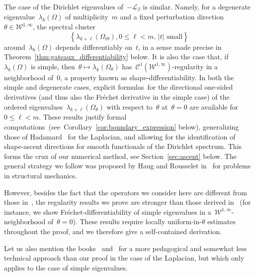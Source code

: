 \documentclass[a4]{article}
\newcommand{\cL}{\mathcal{L}}
\newcommand{\1}{\mathbbm 1}
\newcommand{\Winf}{{{\cW}^{1,\infty}}}
\newcommand{\cW}{\mathcal{W}}
\begin{document}
        The case of the Dirichlet eigenvalues of~$-\cL_\beta$ is similar.
        Namely, for a degenerate eigenvalue~$\lambda_k(\Omega)$ of multiplicity~$m$ and a fixed perturbation direction~$\theta\in\Winf$, the spectral cluster
        $$\left\{\lambda_{k+\ell}(\Omega_{t\theta}),0\leq \ell < m,\,|t|\text{ small}\right\}$$
         around~$\lambda_k(\Omega)$ depends differentiably on~$t$, in a sense made precise in Theorem~\ref{thm:gateaux_differentiability} below.
        It is also the case that, if~$\lambda_k(\Omega)$ is simple, then~$\theta\mapsto \lambda_k(\Omega_\theta)$ has~$\mathcal C^1(\Winf)$-regularity in a neighborhood of~$0$, a property known as shape-differentiability.
        In both the simple and degenerate cases, explicit formulas~for the directional one-sided derivatives (and thus also the Fréchet derivative in the simple case) of the ordered eigenvalues~$\lambda_{k+\ell}(\Omega_\theta)$ with respect to~$\theta$ at~$\theta=0$ are available for~$0\leq \ell<m$.
        These results justify formal computations~(see~Corollary~\ref{cor:boundary_expression} below), generalizing those of Hadamard~\cite{H08} for the Laplacian, and allowing for the identification of shape-ascent directions for smooth functionals of the Dirichlet spectrum. This forms the crux of our numerical method, see Section~\ref{sec:ascent} below.
        The general strategy we follow was proposed by Haug and Rousselet in~\cite{HR80a,HR80b,R83,HR83} for problems in structural mechanics.
        
        However, besides the fact that the operators we consider here are different from those in~\cite{R83,HR83}, the regularity results we prove are stronger than those derived in~\cite{HR80a,HR80b,R83,HR83} (for instance, we show Fréchet-differentiability of simple eigenvalues in a~$\Winf$-neighborhood of~$\theta=0$). These results require locally uniform-in-$\theta$ estimates throughout the proof, and we therefore give a self-contained derivation.
        
        Let us also mention the books~\cite[Section 5.7]{HP05} and~\cite[Section 2.5]{H06} for a more pedagogical and somewhat less technical approach than our proof in the case of the Laplacian, but which only applies to the case of simple eigenvalues.
\end{document}

